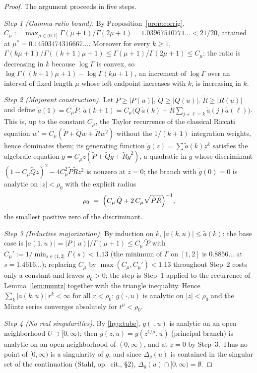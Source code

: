 \documentclass[11pt]{article}
\theoremstyle{definition}
\begin{document}
\begin{proof}
The argument proceeds in five steps.

\emph{Step 1 (Gamma-ratio bound).}
By Proposition~\ref{prop:corrig},
$C_{\mu} := \max_{\mu\in(0,1]} \Gamma(\mu+1)/\Gamma(2\mu+1)
= 1.03967510771\ldots < 21/20$, attained at
$\mu^{*} = 0.14503474316667\ldots$. Moreover for every $k \geq 1$,
$\Gamma(k\mu+1)/\Gamma((k+1)\mu+1) \leq \Gamma(\mu+1)/\Gamma(2\mu+1)
\leq C_{\mu}$: the ratio is decreasing in $k$ because
$\log\Gamma$ is convex, so
$\log\Gamma((k+1)\mu+1) - \log\Gamma(k\mu+1)$, an increment of
$\log\Gamma$ over an interval of fixed length $\mu$ whose left
endpoint increases with $k$, is increasing in $k$.

\emph{Step 2 (Majorant construction).}
Let $\tilde P \geq |P(u)|$, $\tilde Q \geq |Q(u)|$,
$\tilde R \geq |R(u)|$ and define $\tilde a(1) = C_{\mu}\tilde P$,
$\tilde a(k+1) = C_{\mu}\bigl(\tilde Q\,\tilde a(k) + \tilde R
\sum_{j+\ell=k} \tilde a(j)\tilde a(\ell)\bigr)$. This is, up to the
constant $C_{\mu}$, the Taylor recurrence of the classical Riccati
equation $w' = C_{\mu}(\tilde P + \tilde Q w + \tilde R w^{2})$
without the $1/(k+1)$ integration weights, hence dominates them; its
generating function $\tilde g(z) = \sum \tilde a(k) z^{k}$ satisfies
the algebraic equation
$\tilde g = C_{\mu} z (\tilde P + \tilde Q \tilde g + \tilde R
\tilde g^{2})$, a quadratic in $\tilde g$ whose discriminant
$(1 - C_{\mu}\tilde Q z)^{2} - 4C_{\mu}^{2}\tilde P \tilde R z^{2}$
is nonzero at $z = 0$; the branch with $\tilde g(0) = 0$ is analytic
on $|z| < \rho_{0}$ with the explicit radius
\[
\rho_{0} \;=\; \Bigl( C_{\mu}\,\tilde Q
+ 2\,C_{\mu}\sqrt{\tilde P \tilde R} \Bigr)^{-1},
\]
the smallest positive zero of the discriminant.

\emph{Step 3 (Inductive majorization).}
By induction on $k$, $|a(k,u)| \leq \tilde a(k)$: the base case is
$|a(1,u)| = |P(u)|/\Gamma(\mu+1) \leq C_{\mu}'\tilde P$ with
$C_{\mu}' := 1/\min_{s\in(1,2]}\Gamma(s) < 1.13$ (the minimum of
$\Gamma$ on $[1,2]$ is $0.8856\ldots$ at $s = 1.4616\ldots$);
replacing $C_{\mu}$ by $\max(C_{\mu}, C_{\mu}') < 1.13$ throughout
Step~2 costs only a constant and leaves $\rho_{0} > 0$; the step is
Step~1 applied to the
recurrence of Lemma~\ref{lem:muntz} together with the triangle
inequality. Hence $\sum_{k} |a(k,u)|\, r^{k} < \infty$ for all
$r < \rho_{0}$: $g(\cdot,u)$ is analytic on $|z| < \rho_{0}$ and
the M\"untz series converges absolutely for
$t^{\mu} < \rho_{0}$.

\emph{Step 4 (No real singularities).}
By \ref{hyp:tube}, $y(\cdot,u)$ is analytic on an open neighborhood
$U \supset [0,\infty)$; then $g(z,u) = y(z^{1/\mu},u)$ (principal
branch) is analytic on an open neighborhood of $(0,\infty)$, and at
$z=0$ by Step~3. Thus no point of $[0,\infty)$ is a singularity of
$g$, and since $\Delta_{g}(u)$ is contained in the singular set of
the continuation (Stahl, op.~cit., \S2),
$\Delta_{g}(u) \cap [0,\infty) = \emptyset$.


\end{proof}
\end{document}
